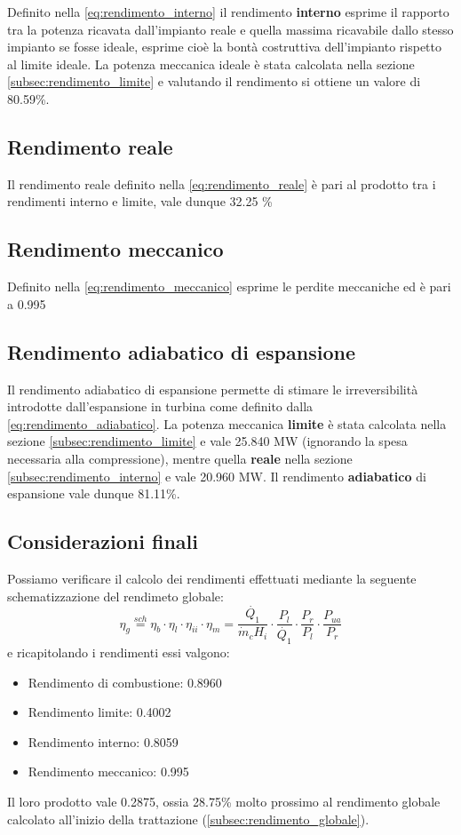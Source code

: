 \documentclass[a4paper,12pt]{article}
\begin{document}
Definito nella \eqref{eq:rendimento_interno} il rendimento \textbf{interno} esprime il rapporto tra la potenza ricavata dall'impianto reale
e quella massima ricavabile dallo stesso impianto se fosse ideale, esprime cioè la bontà costruttiva dell'impianto rispetto al limite ideale.
La potenza meccanica ideale è stata calcolata nella sezione \ref{subsec:rendimento_limite} e valutando il rendimento si ottiene un valore di 
80.59\%.

\subsection{Rendimento reale}
Il rendimento reale definito nella \eqref{eq:rendimento_reale} è pari al prodotto tra i rendimenti interno e limite, vale dunque 32.25 \%

\subsection{Rendimento meccanico}
Definito nella \eqref{eq:rendimento_meccanico} esprime le perdite meccaniche ed è pari a 0.995

\subsection{Rendimento adiabatico di espansione}
Il rendimento adiabatico di espansione permette di stimare le irreversibilità introdotte dall'espansione in turbina come definito dalla \eqref{eq:rendimento_adiabatico}.
La potenza meccanica \textbf{limite} è stata calcolata nella sezione \ref{subsec:rendimento_limite} e vale 25.840 MW (ignorando la spesa necessaria alla compressione),
mentre quella \textbf{reale} nella sezione \ref{subsec:rendimento_interno} e vale 20.960 MW.
Il rendimento \textbf{adiabatico} di espansione vale dunque 81.11\%.

\subsection{Considerazioni finali}
Possiamo verificare il calcolo dei rendimenti effettuati mediante la seguente schematizzazione del rendimeto globale:
\begin{equation}
    \eta_g \stackrel{sch}{=} \eta_b \cdot \eta_l \cdot \eta_{ii} \cdot \eta_m
    = \frac{\dot{Q_1}}{\dot{m}_c H_i}\cdot \frac{P_l}{\dot{Q_1}} \cdot \frac{P_r}{P_l}\cdot \frac{P_{ua}}{P_r}
\end{equation}
e ricapitolando i rendimenti essi valgono:
\begin{itemize}
    \item Rendimento di combustione: 0.8960
    \item Rendimento limite: 0.4002
    \item Rendimento interno: 0.8059
    \item Rendimento meccanico: 0.995
\end{itemize}
Il loro prodotto vale 0.2875, ossia 28.75\% molto prossimo al rendimento globale calcolato all'inizio della trattazione (\ref{subsec:rendimento_globale}).

\end{document}
